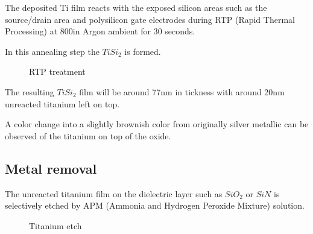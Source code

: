 The deposited Ti film reacts with the exposed silicon areas such as the source/drain area and polysilicon gate electrodes during RTP (Rapid Thermal Processing) at 800\degreesC in Argon ambient for 30 seconds.

In this annealing step the $Ti Si_2$ is formed.

\begin{figure}[H]
	\centering
	\begin{tikzpicture}[node distance = 3cm, auto, thick,scale=\CrossSectionOnly, every node/.style={transform shape}]
		
	\end{tikzpicture}
	\begin{tikzpicture}[node distance = 3cm, auto, thick,scale=\CrossSectionOnly, every node/.style={transform shape}]
		
	\end{tikzpicture}
	\caption{RTP treatment}
\end{figure}

The resulting $Ti Si_2$ film will be around 77nm in tickness with around 20nm unreacted titanium left on top.

A color change into a slightly brownish color from originally silver metallic can be observed of the titanium on top of the oxide.

\newpage

\subsection{Metal removal}

The unreacted titanium film on the dielectric layer such as $SiO_2$ or $SiN$ is selectively etched by APM (Ammonia and Hydrogen Peroxide Mixture) solution.

\begin{figure}[H]
	\centering
	\begin{tikzpicture}[node distance = 3cm, auto, thick,scale=\CrossSectionOnly, every node/.style={transform shape}]
		
	\end{tikzpicture}
	\begin{tikzpicture}[node distance = 3cm, auto, thick,scale=\CrossSectionOnly, every node/.style={transform shape}]
		
	\end{tikzpicture}
	\caption{Titanium etch}
\end{figure}


